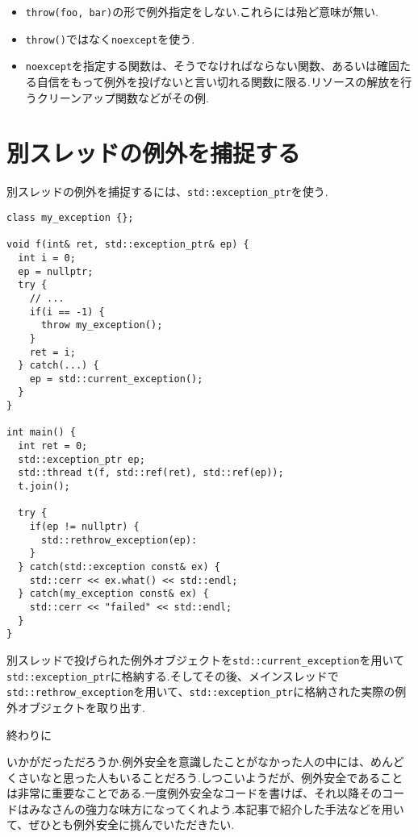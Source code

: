 \documentclass[a4j,11pt,openright]{jsbook}
\makeatletter
\renewcommand{\chapter}{\@startsection {chapter}{1}{\z@}{-3.5ex \@plus -1ex \@minus -.2ex}{2.3ex \@plus.2ex}
{\normalfont\LARGE\bfseries}}
\makeatother
\begin{document}
\begin{itemize}
  \item \verb|throw(foo, bar)|の形で例外指定をしない.これらには殆ど意味が無い.
  \item \verb|throw()|ではなく\verb|noexcept|を使う.
  \item \verb|noexcept|を指定する関数は、そうでなければならない関数、あるいは確固たる自信をもって例外を投げないと言い切れる関数に限る.リソースの解放を行うクリーンアップ関数などがその例.
\end{itemize}


\section{別スレッドの例外を捕捉する}

別スレッドの例外を捕捉するには、\verb|std::exception_ptr|を使う.

\begin{verbatim}
class my_exception {};

void f(int& ret, std::exception_ptr& ep) {
  int i = 0;
  ep = nullptr;
  try {
    // ...
    if(i == -1) {
      throw my_exception();
    }
    ret = i;
  } catch(...) {
    ep = std::current_exception();
  }
}

int main() {
  int ret = 0;
  std::exception_ptr ep;
  std::thread t(f, std::ref(ret), std::ref(ep));
  t.join();

  try {
    if(ep != nullptr) {
      std::rethrow_exception(ep):
    }
  } catch(std::exception const& ex) {
    std::cerr << ex.what() << std::endl;
  } catch(my_exception const& ex) {
    std::cerr << "failed" << std::endl;
  }
}
\end{verbatim}

別スレッドで投げられた例外オブジェクトを\verb|std::current_exception|を用いて\verb|std::exception_ptr|に格納する.そしてその後、メインスレッドで\verb|std::rethrow_exception|を用いて、\verb|std::exception_ptr|に格納された実際の例外オブジェクトを取り出す.

\chapter{終わりに}

いかがだっただろうか.例外安全を意識したことがなかった人の中には、めんどくさいなと思った人もいることだろう.しつこいようだが、例外安全であることは非常に重要なことである.一度例外安全なコードを書けば、それ以降そのコードはみなさんの強力な味方になってくれよう.本記事で紹介した手法などを用いて、ぜひとも例外安全に挑んでいただきたい.
\end{document}
